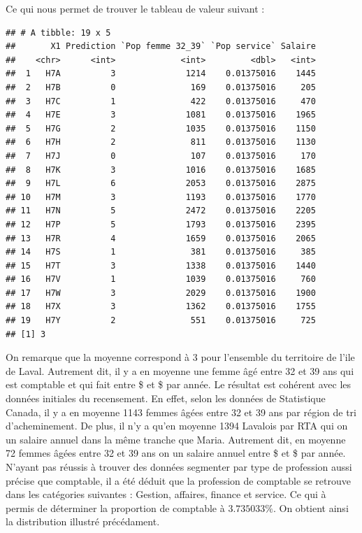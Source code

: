 \documentclass[11pt,french]{report}\usepackage[]{graphicx}\usepackage[]{color}
\makeatletter
\newenvironment{kframe}{%
 \def\at@end@of@kframe{}%
 \ifinner\ifhmode%
  \def\at@end@of@kframe{\end{minipage}}%
  \begin{minipage}{\columnwidth}%
 \fi\fi%
 \def\FrameCommand##1{\hskip\@totalleftmargin \hskip-\fboxsep
 \colorbox{shadecolor}{##1}\hskip-\fboxsep
     \hskip-\linewidth \hskip-\@totalleftmargin \hskip\columnwidth}%
 \MakeFramed {\advance\hsize-\width
   \@totalleftmargin\z@ \linewidth\hsize
   \@setminipage}}%
 {\par\unskip\endMakeFramed%
 \at@end@of@kframe}
\newenvironment{knitrout}{}{} %
\makeatother
\begin{document}
Ce qui nous permet de trouver le tableau de valeur suivant :
\begin{knitrout}
\color{fgcolor}\begin{kframe}
\begin{verbatim}
## # A tibble: 19 x 5
##       X1 Prediction `Pop femme 32_39` `Pop service` Salaire
##    <chr>      <int>             <int>         <dbl>   <int>
##  1   H7A          3              1214    0.01375016    1445
##  2   H7B          0               169    0.01375016     205
##  3   H7C          1               422    0.01375016     470
##  4   H7E          3              1081    0.01375016    1965
##  5   H7G          2              1035    0.01375016    1150
##  6   H7H          2               811    0.01375016    1130
##  7   H7J          0               107    0.01375016     170
##  8   H7K          3              1016    0.01375016    1685
##  9   H7L          6              2053    0.01375016    2875
## 10   H7M          3              1193    0.01375016    1770
## 11   H7N          5              2472    0.01375016    2205
## 12   H7P          5              1793    0.01375016    2395
## 13   H7R          4              1659    0.01375016    2065
## 14   H7S          1               381    0.01375016     385
## 15   H7T          3              1338    0.01375016    1440
## 16   H7V          1              1039    0.01375016     760
## 17   H7W          3              2029    0.01375016    1900
## 18   H7X          3              1362    0.01375016    1755
## 19   H7Y          2               551    0.01375016     725
## [1] 3
\end{verbatim}
\end{kframe}
\end{knitrout}
On remarque que la moyenne correspond à 3 pour l'ensemble du territoire de l'ile de Laval. Autrement dit, il y a en moyenne une femme âgé entre 32 et 39 ans qui est comptable et qui fait entre \$ et  \$ par année. Le résultat est cohérent avec les données initiales du recensement. En effet, selon les données de Statistique Canada, il y a en moyenne 1143 femmes âgées entre 32 et 39 ans par région de tri d'acheminement. De plus, il n'y a qu'en moyenne 1394 Lavalois par RTA qui on un salaire annuel dans la même tranche que Maria. Autrement dit, en moyenne 72 femmes âgées entre 32 et 39 ans on un salaire annuel entre \$ et  \$ par année. N'ayant pas réussis à trouver des données segmenter par type de profession aussi précise que comptable, il a été déduit que la profession de comptable se retrouve dans les catégories suivantes : Gestion, affaires, finance et service. Ce qui à permis de déterminer la proportion de comptable à $3.735033 \%$. On obtient ainsi la distribution illustré précédament. \newline
\end{document}
